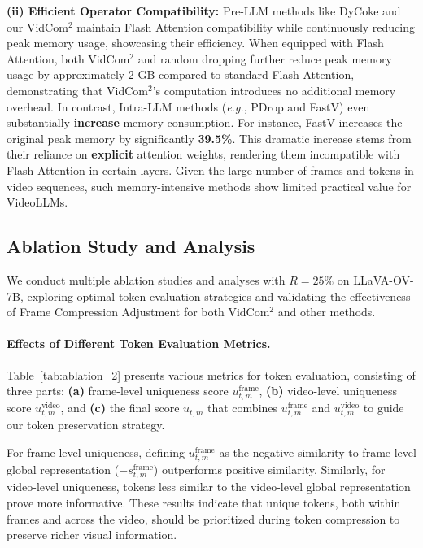 \noindent \textbf{(ii) Efficient Operator Compatibility:} Pre-LLM methods like DyCoke and our VidCom$^2$ maintain Flash Attention compatibility while continuously reducing peak memory usage, showcasing their efficiency. When equipped with Flash Attention, both VidCom$^2$ and random dropping further reduce peak memory usage by approximately 2 GB compared to standard Flash Attention, demonstrating that VidCom$^2$'s computation introduces no additional memory overhead. In contrast, Intra-LLM methods (\textit{e.g.}, PDrop and FastV) even substantially \textbf{increase} memory consumption. For instance, FastV increases the original peak memory by significantly \textbf{39.5\%}. This dramatic increase stems from their reliance on \textbf{explicit} attention weights, rendering them incompatible with Flash Attention in certain layers. Given the large number of frames and tokens in video sequences, such memory-intensive methods show limited practical value for VideoLLMs.





\subsection{Ablation Study and Analysis}
\label{subsec:Ablation}

We conduct multiple ablation studies and analyses with $R = 25\%$ on LLaVA-OV-7B, exploring optimal token evaluation strategies and validating the effectiveness of Frame Compression Adjustment for both VidCom$^2$ and other methods.


\paragraph{Effects of Different Token Evaluation Metrics.}

Table~\ref{tab:ablation_2} presents various metrics for token evaluation, consisting of three parts: \textbf{(a)} frame-level uniqueness score $u^\mathrm{frame}_{t,m}$, \textbf{(b)} video-level uniqueness score $u^\mathrm{video}_{t,m}$, and \textbf{(c)} the final score $u_{t,m}$ that combines $u^\mathrm{frame}_{t,m}$ and $u^\mathrm{video}_{t,m}$ to guide our token preservation strategy.

For frame-level uniqueness, defining $u^\mathrm{frame}_{t,m}$ as the negative similarity to frame-level global representation ($-s^\mathrm{frame}_{t,m}$) outperforms positive similarity. Similarly, for video-level uniqueness, tokens less similar to the video-level global representation prove more informative. These results indicate that unique tokens, both within frames and across the video, should be prioritized during token compression to preserve richer visual information.


